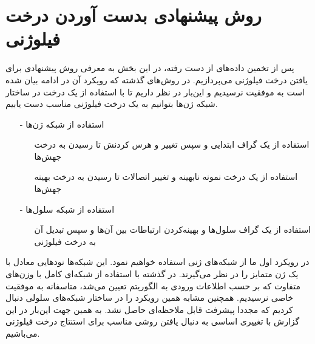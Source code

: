 \pagebreak
\section{روش پیشنهادی بدست آوردن درخت فیلوژنی}
پس از تخمین داده‌های از دست رفته، در این بخش به معرفی روش پیشنهادی برای یافتن درخت فیلوژنی می‌پردازیم. در روش‌های گذشته که رویکرد آن در ادامه بیان شده است به موفقیت نرسیدیم و این‌بار در نظر داریم تا با استفاده از یک درخت در ساختار شبکه ژن‌ها بتوانیم به یک درخت فیلوژنی مناسب دست یابیم.  

\begin{itemize}
	\item[-] استفاده از شبکه ژن‌ها
	\begin{itemize}
		\item[\xmark] استفاده از یک  گراف ابتدایی و سپس تغییر و هرس کردنش تا رسیدن به درخت جهش‌ها
		\item[\cmark] استفاده از یک درخت نمونه نابهینه و تغییر اتصالات تا رسیدن به درخت بهینه جهش‌ها
	\end{itemize}
	\item[-] استفاده از شبکه سلول‌ها
	\begin{itemize}
		\item[\xmark] استفاده از یک گراف سلول‌ها و بهینه‌کردن ارتباطات بین آن‌ها و سپس تبدیل آن به درخت فیلوژنی
	\end{itemize}
\end{itemize}

در رویکرد اول ما از شبکه‌های ژنی استفاده خواهیم نمود. این شبکه‌ها نودهایی معادل با یک ژن متمایز را در نظر می‌گیرند. در گذشته با استفاده از شبکه‌ای کامل با وزن‌های متفاوت که بر حسب اطلاعات ورودی به الگوریتم تعیین می‌شد، متاسفانه به موفقیت خاصی نرسیدیم. همچنین مشابه همین رویکرد را در ساختار شبکه‌های سلولی دنبال کردیم که مجددا پیشرفت قابل ملاحظه‌ای حاصل نشد. به همین جهت این‌بار در این گزارش با تغییری اساسی به دنبال یافتن روشی مناسب برای استنتاج درخت فیلوژنی می‌باشیم.

